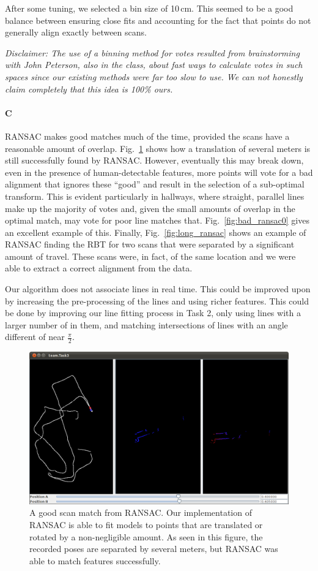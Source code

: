 \documentclass[12pt]{article}
\begin{document}
After some tuning, we selected a bin size of 10\,cm. This seemed to be a good
balance between ensuring close fits and accounting for the fact that points do
not generally align exactly between scans.

\emph{Disclaimer: The use of a binning method for votes resulted from brainstorming with John Peterson,
    also in the class, about fast ways to calculate votes in such spaces since our existing methods
    were far too slow to use. We can not honestly claim completely that this idea is 100\% ours.}

\paragraph{C}
RANSAC makes good matches much of the time, provided the scans have a reasonable
amount of overlap. Fig.~\ref{fig:good_ransac0} shows how a translation of several
meters is still successfully found by RANSAC. However, eventually this may break
down, even in the presence of human-detectable features, more points will vote
for a bad alignment that ignores these ``good'' and result in the selection of
a sub-optimal transform. This is evident particularly in hallways, where straight,
parallel lines make up the majority of votes and, given the small amounts of overlap in
the optimal match, may vote for poor line matches that. Fig.~\ref{fig:bad_ransac0} gives
an excellent example of this. Finally, Fig.~\ref{fig:long_ransac} shows an example of
RANSAC finding the RBT for two scans that were separated by a significant amount
of travel. These scans were, in fact, of the same location and we were able to extract
a correct alignment from the data.

Our algorithm does not associate lines in real time.  This could be improved upon by
increasing the pre-processing of the lines and using richer features.  This could be done
by improving our line fitting process in Task 2, only using lines with a larger number of
in them, and matching intersections of lines with an angle different of near $\frac{\pi}{2}$.


\begin{figure}[h!]
\centering
\includegraphics[width=.7\textwidth]{figures/Task3_good0.png}
\caption{A good scan match from RANSAC. Our implementation of RANSAC is able
to fit models to points that are translated or rotated by a non-negligible amount. As seen
in this figure, the recorded poses are separated by several meters, but RANSAC
was able to match features successfully.}
\label{fig:good_ransac0}
\end{figure}
\end{document}
